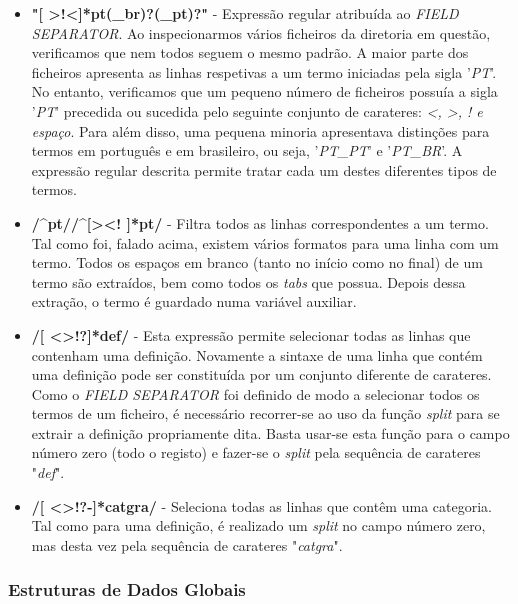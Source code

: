 \documentclass{article}
\begin{document}
\begin{itemize}
    \item \textbf{"[ \textgreater!\textless]*pt(\_br)?(\_pt)?"} - Expressão regular atribuída ao \emph{FIELD SEPARATOR}. Ao inspecionarmos vários ficheiros da diretoria em questão, verificamos que nem todos seguem o mesmo padrão. A maior parte dos ficheiros apresenta as linhas respetivas a um termo iniciadas pela sigla '\emph{PT}'. No entanto, verificamos que um pequeno número de ficheiros possuía a sigla '\emph{PT}' precedida ou sucedida pelo seguinte conjunto de carateres: \emph{\textless, \textgreater, ! e espaço}. Para além disso, uma pequena minoria apresentava distinções para termos em português e em brasileiro, ou seja, '\emph{PT\_PT}' e '\emph{PT\_BR}'. A expressão regular descrita permite tratar cada um destes diferentes tipos de termos. 
    \item \textbf{/\^{}pt/\hspace{0.5em}\textbar\textbar\hspace{0.5em}/\^{}[\textgreater\textless! ]*pt/} - Filtra todos as linhas correspondentes a um termo. Tal como foi, falado acima, existem vários formatos para uma linha com um termo. Todos os espaços em branco (tanto no início como no final) de um termo são extraídos, bem como todos os \emph{tabs} que possua. Depois dessa extração, o termo é guardado numa variável auxiliar.
    \item \textbf{/[ \textless\textgreater!?]*def/} - Esta expressão permite selecionar todas as linhas que contenham uma definição. Novamente a sintaxe de uma linha que contém uma definição pode ser constituída por um conjunto diferente de carateres. Como o \emph{FIELD SEPARATOR} foi definido de modo a selecionar todos os termos de um ficheiro, é necessário recorrer-se ao uso da função \emph{split} para se extrair a definição propriamente dita. Basta usar-se esta função para o campo número zero (todo o registo) e fazer-se o \emph{split} pela sequência de carateres "\emph{def}". 
    \item \textbf{/[ \textless\textgreater!?-]*catgra/} - Seleciona todas as linhas que contêm uma categoria. Tal como para uma definição, é realizado um \emph{split} no campo número zero, mas desta vez pela sequência de carateres "\emph{catgra}".
\end{itemize}


\subsubsection{Estruturas de Dados Globais}
\end{document}
